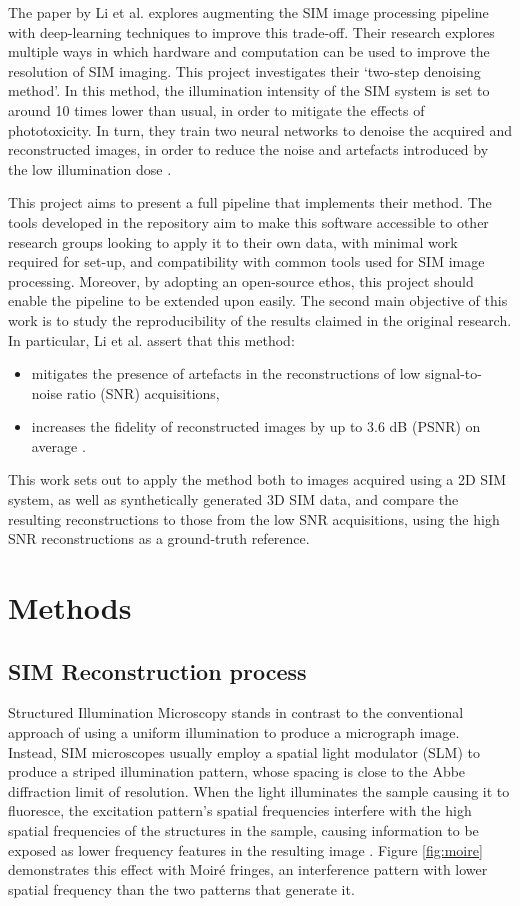\documentclass[12pt]{article}
\begin{document}
The paper by Li et al. \cite{keypaper} explores augmenting the SIM image processing pipeline with deep-learning techniques to improve this trade-off.
Their research explores multiple ways in which hardware and computation can be used to improve the resolution of SIM imaging.
This project investigates their `two-step denoising method'.
In this method, the illumination intensity of the SIM system is set to around 10 times lower than usual,
in order to mitigate the effects of phototoxicity.
In turn, they train two neural networks to denoise the acquired and reconstructed images,
in order to reduce the noise and artefacts introduced by the low illumination dose \cite{keypaper}.

This project aims to present a full pipeline that implements their method.
The tools developed in the repository aim to make this software accessible to other research groups looking to apply it to their own data,
with minimal work required for set-up, and compatibility with common tools used for SIM image processing.
Moreover, by adopting an open-source ethos, this project should enable the pipeline to be extended upon easily.
The second main objective of this work is to study the reproducibility of the results claimed in the original research.
In particular, Li et al. assert that this method:
\begin{itemize}
    \item mitigates the presence of artefacts in the reconstructions of low signal-to-noise ratio (SNR) acquisitions,
    \item increases the fidelity of reconstructed images by up to 3.6 dB (PSNR) on average \cite{keypaper}.
\end{itemize}
This work sets out to apply the method both to images acquired using a 2D SIM system,
as well as synthetically generated 3D SIM data, and compare the resulting reconstructions to those from the low SNR acquisitions,
using the high SNR reconstructions as a ground-truth reference.

\section{Methods}

\subsection{SIM Reconstruction process}

Structured Illumination Microscopy stands in contrast to the conventional approach of using a uniform illumination to produce a micrograph image.
Instead, SIM microscopes usually employ a spatial light modulator (SLM) to produce a striped illumination pattern,
whose spacing is close to the Abbe diffraction limit of resolution.
When the light illuminates the sample causing it to fluoresce,
the excitation pattern's spatial frequencies interfere with the high spatial frequencies of the structures in the sample,
causing information to be exposed as lower frequency features in the resulting image \cite{SIM2008}.
Figure \ref{fig:moire} demonstrates this effect with Moir\'{e} fringes,
an interference pattern with lower spatial frequency than the two patterns that generate it.
\end{document}
